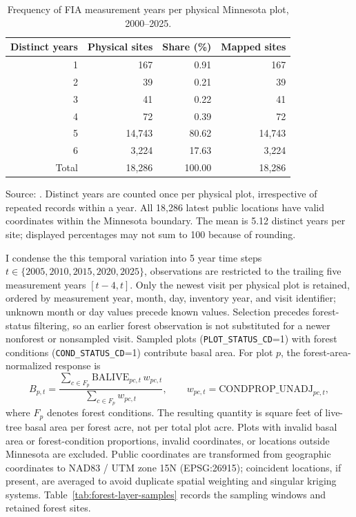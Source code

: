 \documentclass[11pt]{article}
\begin{document}
\begin{table}[htbp]
\centering
\caption{Frequency of FIA measurement years per physical Minnesota plot, 2000--2025.}
\label{tab:fia-frequency}
\begin{tabular}{@{}rrrr@{}}
\toprule
Distinct years & Physical sites & Share (\%) & Mapped sites \\
\midrule
1 & 167 & 0.91 & 167 \\
2 & 39 & 0.21 & 39 \\
3 & 41 & 0.22 & 41 \\
4 & 72 & 0.39 & 72 \\
5 & 14,743 & 80.62 & 14,743 \\
6 & 3,224 & 17.63 & 3,224 \\
\midrule
Total & 18,286 & 100.00 & 18,286 \\
\bottomrule
\end{tabular}

\smallskip
\begin{minipage}{0.95\linewidth}
\footnotesize Source: . Distinct years are counted once per physical plot, irrespective of repeated records within a year. All 18,286 latest public locations have valid coordinates within the Minnesota boundary. The mean is 5.12 distinct years per site; displayed percentages may not sum to 100 because of rounding.
\end{minipage}
\end{table}

I condense the this temporal variation into 5 year time steps $t\in\{2005,2010,2015,2020,2025\}$, observations are restricted to the trailing five measurement years $[t-4,t]$. Only the newest visit per physical plot is retained, ordered by measurement year, month, day, inventory year, and visit identifier; unknown month or day values precede known values. Selection precedes forest-status filtering, so an earlier forest observation is not substituted for a newer nonforest or nonsampled visit. Sampled plots (\texttt{PLOT\_STATUS\_CD}=1) with forest conditions (\texttt{COND\_STATUS\_CD}=1) contribute basal area. For plot $p$, the forest-area-normalized response is
\begin{equation}
B_{p,t} =
\frac{\sum_{c\in F_p}\mathrm{BALIVE}_{pc,t}\,w_{pc,t}}
     {\sum_{c\in F_p}w_{pc,t}},
\qquad
w_{pc,t}=\mathrm{CONDPROP\_UNADJ}_{pc,t},
\label{eq:plot-basal-area}
\end{equation}
where $F_p$ denotes forest conditions. The resulting quantity is square feet of live-tree basal area per forest acre, not per total plot acre. Plots with invalid basal area or forest-condition proportions, invalid coordinates, or locations outside Minnesota are excluded. Public coordinates are transformed from geographic coordinates to NAD83 / UTM zone 15N (EPSG:26915); coincident locations, if present, are averaged to avoid duplicate spatial weighting and singular kriging systems. Table~\ref{tab:forest-layer-samples} records the sampling windows and retained forest sites. 
\end{document}
